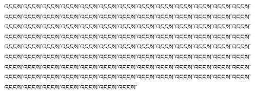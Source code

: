 \begin{tibetan}\raggedright
འངངས་འངངས་འངངས་འངངས་འངངས་འངངས་འངངས་འངངས་འངངས་འངངས་འངངས་འངངས་འངངས་འངངས་འངངས་འངངས་འངངས་འངངས་འངངས་འངངས་འངངས་འངངས་འངངས་འངངས་འངངས་འངངས་འངངས་འངངས་འངངས་འངངས་འངངས་འངངས་འངངས་འངངས་འངངས་འངངས་འངངས་འངངས་འངངས་འངངས་འངངས་འངངས་འངངས་འངངས་འངངས་འངངས་འངངས་འངངས་འངངས་འངངས་འངངས་འངངས་འངངས་འངངས་འངངས་འངངས་འངངས་འངངས་འངངས་འངངས་འངངས་འངངས་འངངས་འངངས་འངངས་འངངས་འངངས་འངངས་འངངས་འངངས་འངངས་འངངས་འངངས་འངངས་འངངས་འངངས་འངངས་འངངས་འངངས་འངངས་འངངས་འངངས་འངངས་འངངས་འངངས་འངངས་འངངས་འངངས་འངངས་འངངས་འངངས་འངངས་འངངས་འངངས་འངངས་འངངས་འངངས་འངངས་འངངས་འངངས་འངངས་འངངས་འངངས་འངངས་འངངས་འངངས་འངངས་འངངས་འངངས་འངངས་འངངས་

\end{tibetan}

